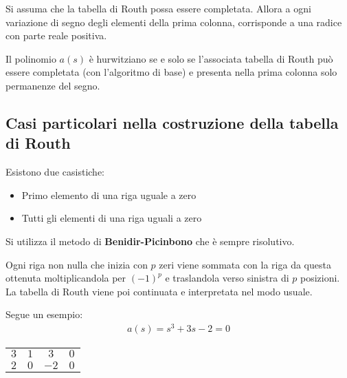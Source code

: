 \begin{definition}[Routh]
    Si assuma che la tabella di Routh possa essere completata.    
    Allora a ogni variazione di segno degli elementi della prima colonna,
    corrisponde a una radice con parte reale positiva.
\end{definition}

\begin{definition}
    Il polinomio $a(s)$ è hurwitziano se e solo se l'associata tabella di Routh
    può essere completata (con l'algoritmo di base) e presenta nella prima 
    colonna solo permanenze del segno.
\end{definition}

\subsection{Casi particolari nella costruzione della tabella di Routh}
Esistono due casistiche:
\begin{itemize}
    \item Primo elemento di una riga uguale a zero
    \item Tutti gli elementi di una riga uguali a zero
\end{itemize}



Si utilizza il metodo di \textbf{Benidir-Picinbono} che è sempre risolutivo.


\begin{theorem}
    Ogni riga non nulla che inizia con $p$ zeri viene sommata con la riga da questa ottenuta
    moltiplicandola per $(-1)^p$ e traslandola verso sinistra di $p$ posizioni.
    La tabella di Routh viene poi continuata e interpretata nel modo usuale.
\end{theorem}


Segue un esempio:
\begin{align}
    a(s) = s^3 + 3s -2 = 0
\end{align}

\begin{table}
    \centering
    \begin{tabular}{c | c c c}
        $3$ & $1$ & $3$ & $0$ \\
        $2$ & $0$ & $-2$ & $0$ \\
    \end{tabular}
\end{table}

